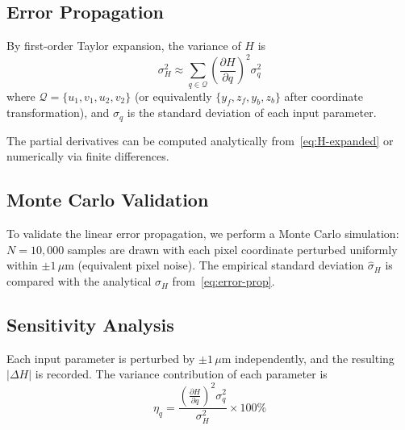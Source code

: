 

\subsection{Error Propagation}
\label{sec:error-prop}

By first-order Taylor expansion, the variance of $H$ is
%
\begin{equation}
  \sigma_H^2 \approx
    \sum_{q \in \mathcal{Q}}
    \left(\frac{\partial H}{\partial q}\right)^2
    \sigma_q^2
  \label{eq:error-prop}
\end{equation}
%
where
$\mathcal{Q} = \{u_1, v_1, u_2, v_2\}$
(or equivalently $\{y_f, z_f, y_b, z_b\}$ after
coordinate transformation),
and $\sigma_q$ is the standard deviation of each
input parameter.

The partial derivatives can be computed analytically
from~\eqref{eq:H-expanded} or numerically via finite
differences.



\subsection{Monte Carlo Validation}
\label{sec:mc}

To validate the linear error propagation, we perform
a Monte Carlo simulation:
%
$N = 10{,}000$ samples are drawn with each pixel coordinate
perturbed uniformly within $\pm 1\,\mu\mathrm{m}$
(equivalent pixel noise).
%
The empirical standard deviation $\hat{\sigma}_H$ is compared
with the analytical $\sigma_H$ from~\eqref{eq:error-prop}.



\subsection{Sensitivity Analysis}
\label{sec:sensitivity}

Each input parameter is perturbed by $\pm 1\,\mu\mathrm{m}$
independently, and the resulting $|\Delta H|$ is recorded.
%
The variance contribution of each parameter is
%
\begin{equation}
  \eta_q
    = \frac{
        \left(\frac{\partial H}{\partial q}\right)^2 \sigma_q^2
      }{
        \sigma_H^2
      }
    \times 100\%
  \label{eq:variance-contrib}
\end{equation}

